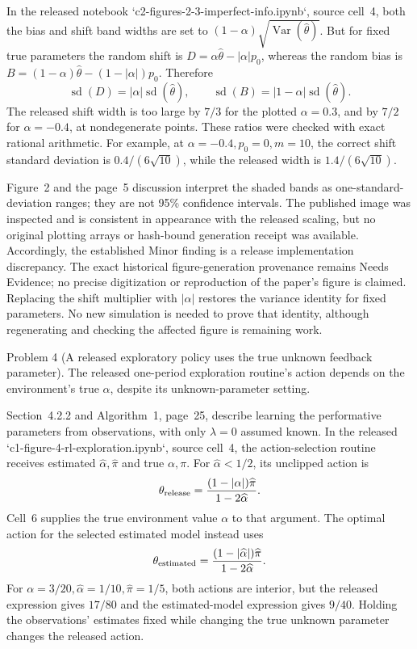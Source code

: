 \documentclass[10pt]{article}
\begin{document}
In the released notebook `c2-figures-2-3-imperfect-info.ipynb`, source cell 4, both the bias and shift band widths are set to \((1-\alpha)\sqrt{\operatorname{Var}(\widehat\theta)}\). But for fixed true parameters the random shift is \(D=\alpha\widehat\theta-|\alpha|p_0\), whereas the random bias is \(B=(1-\alpha)\widehat\theta-(1-|\alpha|)p_0\). Therefore \[\operatorname{sd}(D)=|\alpha|\operatorname{sd}(\widehat\theta),
 \qquad
 \operatorname{sd}(B)=|1-\alpha|\operatorname{sd}(\widehat\theta).\] The released shift width is too large by \(7/3\) for the plotted \(\alpha=0.3\), and by \(7/2\) for \(\alpha=-0.4\), at nondegenerate points. These ratios were checked with exact rational arithmetic. For example, at \(\alpha=-0.4,p_0=0,m=10\), the correct shift standard deviation is \(0.4/(6\sqrt{10})\), while the released width is \(1.4/(6\sqrt{10})\).\par
Figure 2 and the page 5 discussion interpret the shaded bands as one-standard-deviation ranges; they are not 95\% confidence intervals. The published image was inspected and is consistent in appearance with the released scaling, but no original plotting arrays or hash-bound generation receipt was available. Accordingly, the established Minor finding is a release implementation discrepancy. The exact historical figure-generation provenance remains Needs Evidence; no precise digitization or reproduction of the paper’s figure is claimed. Replacing the shift multiplier with \(|\alpha|\) restores the variance identity for fixed parameters. No new simulation is needed to prove that identity, although regenerating and checking the affected figure is remaining work.\par
Problem 4 (A released exploratory policy uses the true unknown feedback parameter).  The released one-period exploration routine’s action depends on the environment’s true \(\alpha\), despite its unknown-parameter setting.\par
Section 4.2.2 and Algorithm 1, page 25, describe learning the performative parameters from observations, with only \(\lambda=0\) assumed known. In the released `c1-figure-4-rl-exploration.ipynb`, source cell 4, the action-selection routine receives estimated \(\widehat\alpha,\widehat\pi\) and true \(\alpha,\pi\). For \(\widehat\alpha<1/2\), its unclipped action is \[\theta_{\rm release}
 =\frac{(1-|\alpha|)\widehat\pi}{1-2\widehat\alpha}.\] Cell 6 supplies the true environment value \(\alpha\) to that argument. The optimal action for the selected estimated model instead uses \[\theta_{\rm estimated}
 =\frac{(1-|\widehat\alpha|)\widehat\pi}{1-2\widehat\alpha}.\] For \(\alpha=3/20,\widehat\alpha=1/10,\widehat\pi=1/5\), both actions are interior, but the released expression gives \(17/80\) and the estimated-model expression gives \(9/40\). Holding the observations’ estimates fixed while changing the true unknown parameter changes the released action.\par
\end{document}
